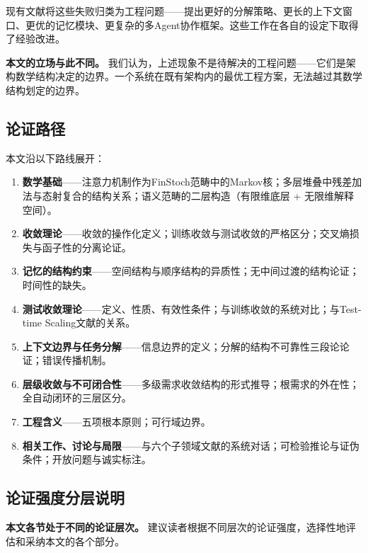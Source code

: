 \documentclass[11pt,a4paper]{ctexart}
\begin{document}
现有文献将这些失败归类为工程问题——提出更好的分解策略\cite{LEAD2025}、更长的上下文窗口、更优的记忆模块\cite{HAMR2025,CognitiveMemory2025}、更复杂的多Agent协作框架\cite{MACI2025,ChainOfAgents2024}。这些工作在各自的设定下取得了经验改进。

\textbf{本文的立场与此不同。} 我们认为，上述现象不是待解决的工程问题——它们是架构数学结构决定的边界。一个系统在既有架构内的最优工程方案，无法越过其数学结构划定的边界。

\subsection{论证路径}

本文沿以下路线展开：

\begin{enumerate}[leftmargin=*,label=§\arabic*]
    \item \textbf{数学基础}——注意力机制作为FinStoch范畴中的Markov核；多层堆叠中残差加法与态射复合的结构关系；语义范畴的二层构造（有限维底层 + 无限维解释空间）。
    \item \textbf{收敛理论}——收敛的操作化定义；训练收敛与测试收敛的严格区分；交叉熵损失与函子性的分离论证。
    \item \textbf{记忆的结构约束}——空间结构与顺序结构的异质性；无中间过渡的结构论证；时间性的缺失。
    \item \textbf{测试收敛理论}——定义、性质、有效性条件；与训练收敛的系统对比；与Test-time Scaling文献的关系。
    \item \textbf{上下文边界与任务分解}——信息边界的定义；分解的结构不可靠性三段论论证；错误传播机制。
    \item \textbf{层级收敛与不可闭合性}——多级需求收敛结构的形式推导；根需求的外在性；全自动闭环的三层区分。
    \item \textbf{工程含义}——五项根本原则；可行域边界。
    \item \textbf{相关工作、讨论与局限}——与六个子领域文献的系统对话；可检验推论与证伪条件；开放问题与诚实标注。
\end{enumerate}

\subsection{论证强度分层说明}

\textbf{本文各节处于不同的论证层次。} 建议读者根据不同层次的论证强度，选择性地评估和采纳本文的各个部分。
\end{document}
